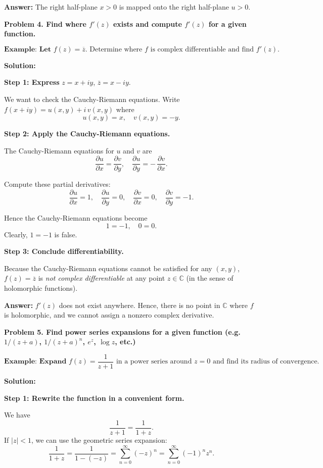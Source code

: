 \documentclass[12pt]{article}
\theoremstyle{definition} %
\theoremstyle{plain} %
\begin{document}
\textbf{Answer:} The right half-plane $x>0$ is mapped onto the right half-plane $u>0$.

\textbf{Problem 4. Find where $f'(z)$ exists and compute $f'(z)$ for a given function.}

\[
\textbf{Example: Let } f(z) = \overline{z}. \text{ Determine where $f$ is complex differentiable and find $f'(z)$.}
\]

\textbf{Solution:}

\textbf{Step 1: Express } $z = x + i y$,  $\overline{z} = x - i y.$

We want to check the Cauchy-Riemann equations. Write $f(x+iy) = u(x,y) + i\,v(x,y)$ where
\[
u(x,y) = x, \quad v(x,y) = -y.
\]

\textbf{Step 2: Apply the Cauchy-Riemann equations.}

The Cauchy-Riemann equations for $u$ and $v$ are
\[
\frac{\partial u}{\partial x} = \frac{\partial v}{\partial y},
\quad
\frac{\partial u}{\partial y} = -\,\frac{\partial v}{\partial x}.
\]

Compute these partial derivatives:
\[
\frac{\partial u}{\partial x} = 1, \quad \frac{\partial u}{\partial y} = 0,
\quad \frac{\partial v}{\partial x} = 0, \quad \frac{\partial v}{\partial y} = -1.
\]

Hence the Cauchy-Riemann equations become
\[
1 = -1, 
\quad 
0 = 0.
\]
Clearly, $1 = -1$ is false. 

\textbf{Step 3: Conclude differentiability.}

Because the Cauchy-Riemann equations cannot be satisfied for any $(x,y)$, $f(z) = \overline{z}$ is \emph{not complex differentiable} at any point $z \in \mathbb{C}$ (in the sense of holomorphic functions).

\textbf{Answer:} $f'(z)$ does not exist anywhere. Hence, there is no point in $\mathbb{C}$ where $f$ is holomorphic, and we cannot assign a nonzero complex derivative.


\textbf{Problem 5. Find power series expansions for a given function (e.g.\ $1/(z+a)$, $1/(z+a)^n$, $e^z$, $\log z$, etc.)}

\[
\textbf{Example: Expand } f(z) = \frac{1}{z+1} \text{ in a power series around } z=0 \text{ and find its radius of convergence.}
\]

\textbf{Solution:}

\textbf{Step 1: Rewrite the function in a convenient form.}

We have
\[
\frac{1}{z+1} = \frac{1}{1 + z}.
\]
If $|z| < 1$, we can use the geometric series expansion:
\[
\frac{1}{1 + z} = \frac{1}{1 - (-z)} = \sum_{n=0}^\infty (-z)^n = \sum_{n=0}^\infty (-1)^n z^n.
\]
\end{document}
